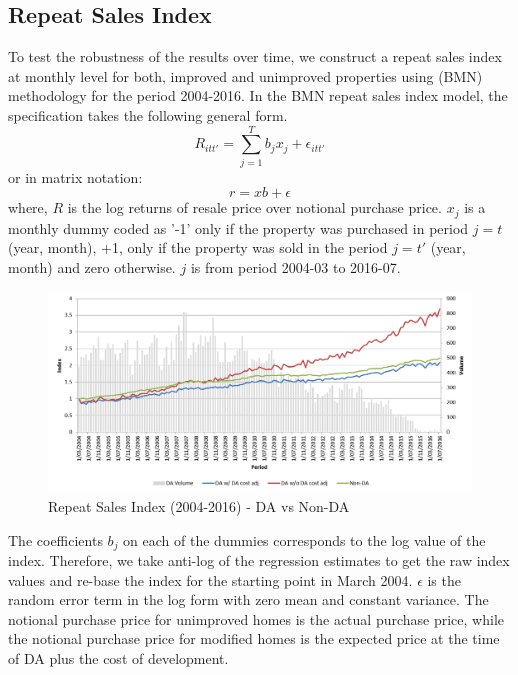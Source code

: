 \documentclass[AEJ,reqno, draftmode]{AEA} %
\begin{document}

\restoregeometry



\subsection{Repeat Sales Index}

To test the robustness of the results over time, we construct a repeat sales index at monthly level for both, improved and unimproved properties using \citet{bailey1963regression} (BMN) methodology for the period 2004-2016. In the BMN repeat sales index model, the specification takes the following general form.
\begin{equation}
    R_{itt'} = \sum\limits_{j=1}^{T} b_jx_j + \epsilon_{itt'}  
\end{equation}
or in matrix notation: $$r = xb + \epsilon$$
where, $R$ is the log returns of resale price over notional purchase price. $x_j$ is a monthly dummy coded as '-1' only if the property was purchased in period $j = t$ (year, month), +1, only if the property was sold in the period $j = t'$ (year, month) and zero otherwise. $j$ is from period 2004-03 to 2016-07. 
\begin{figure}[!htb]
    \centering
     \includegraphics[width=\columnwidth]{Figures/Repeat_sales_index_post_2004_notional_purchase2.png}
 \caption{Repeat Sales Index (2004-2016) - DA vs Non-DA}
 \label{fig:BMN_RS_index_post_2004}
\end{figure}

The coefficients $b_j$ on each of the dummies corresponds to the log value of the index. Therefore, we take anti-log of the regression estimates to get the raw index values and re-base the index for the starting point in March 2004.  $\epsilon$ is the random error term in the log form with zero mean and constant variance. The notional purchase price for unimproved homes is the actual purchase price, while the notional purchase price for modified homes is the expected price at the time of DA plus the cost of development. 
\end{document}
